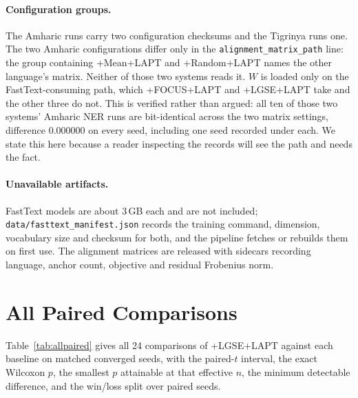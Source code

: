 \documentclass[11pt]{article}
\begin{document}
\paragraph{Configuration groups.} The Amharic runs carry two configuration
checksums and the Tigrinya runs one. The two Amharic configurations differ
only in the \texttt{alignment\_matrix\_path} line: the group containing
+Mean+LAPT and +Random+LAPT names the other language's matrix. Neither of
those two systems reads it. $W$ is loaded only on the FastText-consuming
path, which +FOCUS+LAPT and +LGSE+LAPT take and the other three do not. This
is verified rather than argued: all ten of those two systems' Amharic NER
runs are bit-identical across the two matrix settings, difference
$0.000000$ on every seed, including one seed recorded under each. We state
this here because a reader inspecting the records will see the path and needs
the fact.

\paragraph{Unavailable artifacts.} FastText models are about 3\,GB each and
are not included; \texttt{data/fasttext\_manifest.json} records the training
command, dimension, vocabulary size and checksum for both, and the pipeline
fetches or rebuilds them on first use. The alignment matrices are released
with sidecars recording language, anchor count, objective and residual
Frobenius norm.

\section{All Paired Comparisons}
\label{app:paired}

Table~\ref{tab:allpaired} gives all 24 comparisons of +LGSE+LAPT against each
baseline on matched converged seeds, with the paired-$t$ interval, the exact
Wilcoxon $p$, the smallest $p$ attainable at that effective $n$, the minimum
detectable difference, and the win/loss split over paired seeds.
\end{document}
